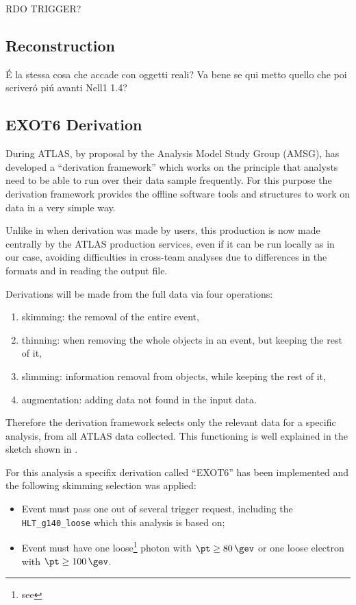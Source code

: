 RDO TRIGGER?

\subsection{Reconstruction}
\'E la stessa cosa che accade con oggetti reali? Va bene se qui metto quello che poi scriver\'o pi\'u avanti Nell1 1.4?

\subsection{EXOT6 Derivation}
During \RunTwo ATLAS, by proposal by the Analysis Model Study Group (AMSG), has developed a ``derivation framework'' which works on the principle that analysts need to be able to run over their data sample frequently. For this purpose the derivation framework provides the offline software tools and structures to work on data in a very simple way. 

Unlike in \RunOne when derivation was made by users, this production is now made centrally by the ATLAS production services, even if it can be run locally as in our case, avoiding difficulties in cross-team analyses due to differences in the formats and in reading the output file.

Derivations will be made from the full data via four operations:
\begin{enumerate}
\item skimming: the removal of the entire event,
\item thinning: when removing the whole objects in an event, but keeping the rest of it,
\item slimming: information removal from objects, while keeping the rest of it,
\item augmentation: adding data not found in the input data.
\end{enumerate}

Therefore the derivation framework selects only the relevant data for a specific analysis, from all ATLAS data collected. This functioning is well explained in the sketch shown in \Fig{\ref{fig:derivation}}.

For this analysis a specifix derivation called ``EXOT6'' has been implemented and the following skimming selection was applied:
\begin{itemize}
\item Event must pass one out of several trigger request, including the \verb!HLT_g140_loose! which this analysis is based on;
\item Event must have one loose\footnote{see \Sect{\ref{photons}}} photon with $\pt\ge\SI{80}{\gev}$ or one loose electron with $\pt\ge\SI{100}{\gev}$.
\end{itemize}
\label{sec:derivation}

